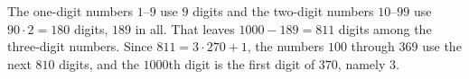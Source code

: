The one-digit numbers $1$--$9$ use $9$ digits and the two-digit numbers $10$--$99$ use $90\cdot2=180$ digits, $189$ in all. That leaves $1000-189=811$ digits among the three-digit numbers. Since $811=3\cdot270+1$, the numbers $100$ through $369$ use the next $810$ digits, and the $1000$th digit is the first digit of $370$, namely $\boxed{3}$.
